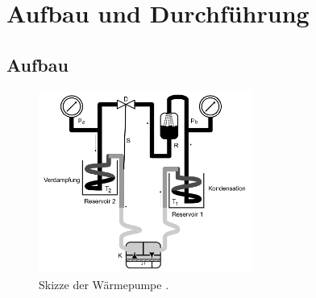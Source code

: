\section{Aufbau und Durchführung}
\label{sec:Durchführung}
\subsection{Aufbau}

\begin{figure}[H]
  \centering
  \includegraphics[height=6cm]{skizze.png}
  \caption{Skizze der Wärmepumpe \cite{sample}.}
  \label{fig:skizze}
\end{figure}


